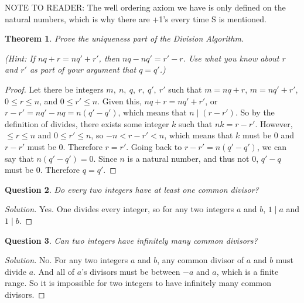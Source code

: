 \documentclass[12pt,leqno]{article}
\numberwithin{equation}{section}
\newtheorem{thm}{Theorem}[section]
\newtheorem{ques}[thm]{Question}
\theoremstyle{definition}
\begin{document}
NOTE TO READER: The well ordering axiom we have is only defined on the natural numbers, which is why there are +1's every time S is mentioned.

\begin{thm}
Prove the uniqueness part of the Division Algorithm.

(\textit{Hint}: If $nq + r = nq' + r'$, then $nq -nq' = r' - r$. Use
what you know about $r$ and $r'$ as part of your argument that $q =
q'$.)
\end{thm}

\begin{proof}[Proof]
Let there be integers $m,\ n,\ q,\ r,\ q',\ r'$ such that $m = nq +r$, $m = nq' + r'$, $0 \leq r \leq n$, and $0 \leq r' \leq n$.  Given this, $nq + r = nq' + r'$, or $r - r' = nq' - nq = n(q' - q')$, which means that $n \mid (r - r')$.  So by the definition of divides, there exists some integer $k$ such that $nk = r-r'$.  However, $\leq r \leq n$ and $0 \leq r' \leq n$, so $-n < r-r' < n$, which means that $k$ must be $0$ and $r-r'$ must be $0$.  Therefore $r = r'$.  Going back to  $r - r' = n(q' - q')$, we can say that $n(q' - q') = 0$.  Since $n$ is a natural number, and thus not $0$, $q' - q$ must be $0$.  Therefore $q = q'$.  
\end{proof}

\setcounter{thm}{28}

\pagebreak
\begin{ques}
Do every two integers have at least one common divisor?
\end{ques}

\begin{proof}[Solution]
Yes.  One divides every integer, so for any two integers $a$ and $b$, $1 \mid a$ and $1 \mid b$.
\end{proof}

\begin{ques}
Can two integers have infinitely many common divisors?
\end{ques}

\begin{proof}[Solution]
No.  For any two integers $a$ and $b$, any common divisor of $a$ and $b$ must divide $a$.  And all of $a$'s divisors must be between $-a$ and $a$, which is a finite range.  So it is impossible for two integers to have infinitely many common divisors.
\end{proof}
\end{document}
